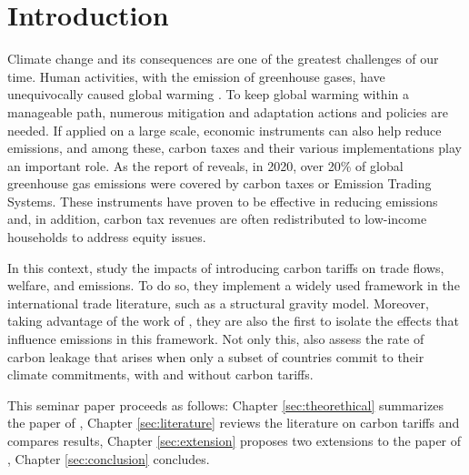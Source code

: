 \chapter{Introduction}

Climate change and its consequences are one of the greatest challenges of our time. Human activities, with the emission of greenhouse gases, have unequivocally caused global warming \parencite{IPCC2023}.  To keep global warming within a manageable path, numerous mitigation and adaptation actions and policies are needed. If applied on a large scale, economic instruments can also help reduce emissions, and among these, carbon taxes and their various implementations play an important role. As the report of \textcite{IPCC2023} reveals, in 2020, over 20\% of global greenhouse gas emissions were covered by carbon taxes or Emission Trading Systems. These instruments have proven to be effective in reducing emissions and, in addition, carbon tax revenues are often redistributed to low-income households to address equity issues.

In this context, \textcite{Larch2017} study the impacts of introducing carbon tariffs on trade flows, welfare, and emissions. To do so, they implement a widely used framework in the international trade literature, such as a structural gravity model. Moreover, taking advantage of the work of \textcite{copeland2005}, they are also the first to isolate the effects that influence emissions in this framework. Not only this, \textcite{Larch2017} also assess the rate of carbon leakage that arises when only a subset of countries commit to their climate commitments, with and without carbon tariffs.

This seminar paper proceeds as follows: Chapter \ref{sec:theorethical} summarizes the paper of \textcite{Larch2017}, Chapter \ref{sec:literature} reviews the literature on carbon tariffs and compares results, Chapter \ref{sec:extension} proposes two extensions to the paper of \textcite{Larch2017}, Chapter \ref{sec:conclusion} concludes.